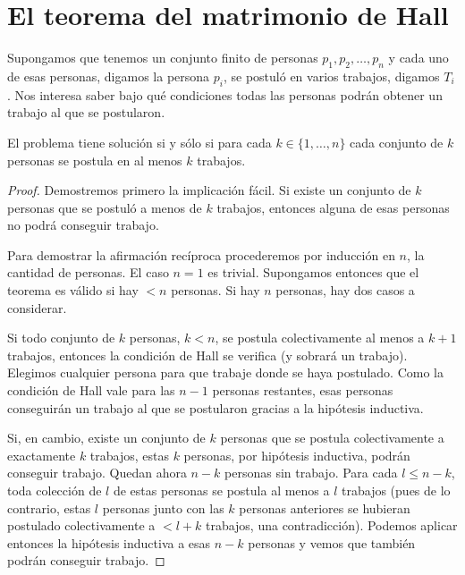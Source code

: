 \chapter{El teorema del matrimonio de Hall}
\label{matrimonio}

Supongamos que tenemos un conjunto finito de personas $p_1,p_2,\dots,p_n$ y cada uno de esas 
personas, digamos la persona $p_i$, se postuló en varios trabajos, digamos $T_i$. 
Nos interesa saber bajo qué condiciones todas 
las personas podrán obtener un trabajo al que se postularon. 

\begin{theorem}[Hall]
El problema tiene solución si y sólo si para 
cada $k\in\{1,\dots,n\}$ cada conjunto de $k$ personas 
se postula en al menos $k$ trabajos.
\end{theorem}

\begin{proof}
    Demostremos primero la implicación fácil. Si existe un conjunto de $k$ personas que se postuló a menos de $k$ trabajos, entonces alguna de esas personas 
    no podrá conseguir trabajo. 
    
    Para demostrar la afirmación recíproca procederemos por 
    inducción en $n$, la cantidad de personas. El caso $n=1$ es trivial. Supongamos entonces que el teorema
    es válido si hay $<n$ personas. Si hay $n$ personas, hay dos casos a considerar. 
    
    Si todo conjunto de $k$ personas, $k<n$, se postula colectivamente al menos a $k+1$ trabajos, entonces la condición de Hall se verifica (y sobrará un trabajo). Elegimos
    cualquier persona para que trabaje donde se haya postulado. Como la condición de Hall vale para las $n-1$ personas restantes, esas personas conseguirán un trabajo al que se postularon 
    gracias a la hipótesis inductiva. 
    
    Si, en cambio, existe un conjunto de $k$ personas que se postula colectivamente a exactamente $k$ trabajos, estas $k$ personas, por hipótesis inductiva, podrán conseguir trabajo. 
    Quedan ahora $n-k$ personas sin trabajo. Para cada $l\leq n-k$, toda colección de $l$ de estas personas se postula al menos a $l$ trabajos 
    (pues de lo contrario, estas $l$ personas junto con las $k$ personas anteriores se hubieran postulado colectivamente a $<l+k$ trabajos, una contradicción). Podemos 
    aplicar entonces la hipótesis inductiva a esas $n-k$ personas y vemos que también podrán conseguir trabajo. 
\end{proof}


